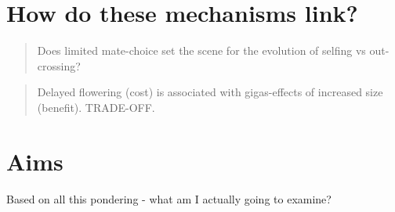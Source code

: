 \documentclass[openany, 12pt, draft]{book}
\begin{document}
\hypertarget{how-do-these-mechanisms-link}{%
\section{How do these mechanisms link?}\label{how-do-these-mechanisms-link}}

\begin{quote}
Does limited mate-choice set the scene for the evolution of selfing vs out-crossing?
\end{quote}

\begin{quote}
Delayed flowering (cost) is associated with gigas-effects of increased size (benefit). TRADE-OFF.
\end{quote}

\hypertarget{aims}{%
\section{Aims}\label{aims}}

Based on all this pondering - what am I actually going to examine?


\end{document}
